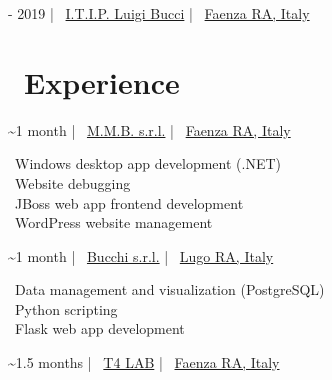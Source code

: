 \documentclass{article}
\begin{document}
\begin{paracol}{2}
\begin{tcolorbox}[title=\faBook \ High School Diploma in Information Technology,colback=white,arc=0pt]
     - 2019 \hfill | \hfill
    \faSchool \ \href{https://www.itipfaenza.edu.it/}{I.T.I.P. Luigi Bucci} \hfill | \hfill
    \faCity \ \href{https://www.openstreetmap.org/relation/2227656}{Faenza RA, Italy}
\end{tcolorbox}

%
%

\vfill

\section*{\faBriefcase \ Experience}

\begin{tcolorbox}[title=\faLaptopCode \ Software Developer Internship,colback=white,arc=0pt]
     \textasciitilde 1 month \hfill | \hfill
    \faBuilding \ \href{https://www.mmbsoftware.it/portalemmb/en/home}{M.M.B. s.r.l.} \hfill | \hfill
    \faCity \ \href{https://www.openstreetmap.org/node/1864397767}{Faenza RA, Italy}

    \tcblower

    \faDesktop \ Windows desktop app development (.NET) \\[4pt]
    \faBug \ Website debugging \\[4pt]
    \faCoffee \ JBoss web app frontend development \\[4pt]
    \faWordpress \ WordPress website management
\end{tcolorbox}

\begin{tcolorbox}[title=\faLaptopCode \ Software Developer Internship,colback=white,arc=0pt]
     \textasciitilde 1 month \hfill | \hfill
    \faIndustry \ \href{http://www.bucchi.it/en/}{Bucchi s.r.l.} \hfill | \hfill
    \faCity \ \href{https://www.openstreetmap.org/node/4752486846}{Lugo RA, Italy}

    \tcblower

    \faDatabase \ Data management and visualization (PostgreSQL) \\[4pt]
    \faPython \ Python scripting \\[4pt]
    \faFlask \ Flask web app development
\end{tcolorbox}

\begin{tcolorbox}[title=\faTools \ Computer Technician Internship,colback=white,arc=0pt]
     \textasciitilde 1.5 months \hfill | \hfill
    \faBuilding \ \href{https://www.t4lab.it/}{T4 LAB} \hfill | \hfill
    \faCity \ \href{https://www.openstreetmap.org/node/4751590216}{Faenza RA, Italy}


\end{tcolorbox}
\end{paracol}
\end{document}
